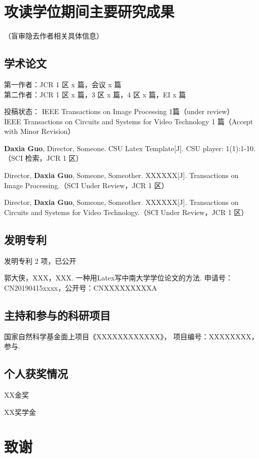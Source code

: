 \section{攻读学位期间主要研究成果} %

\ifblindreview
\noindent
（盲审隐去作者相关具体信息）
\fi
\subsection{学术论文}

\ifblindreview

\noindent
第一作者：JCR 1 区 x 篇，会议 x 篇 \\{}
第二作者：JCR 1 区 x 篇，3 区 x 篇，4 区 x 篇，EI x 篇 

\noindent
投稿状态： 
IEEE Transactions on Image Processing 1篇（under review）\\{}
IEEE Transactions on Circuits and Systems for Video Technology 1 篇（Accept with Minor Revision）
\else
\begin{enumerate}[label={[\arabic*]}]
\item \textbf{Daxia Guo}, Director, Someone. CSU Latex Template[J]. CSU player: 1(1):1-10. （SCI 检索，JCR 1 区）
\item Director, \textbf{Daxia Guo}, Someone, Someother. XXXXXX[J]. Transactions on Image Processing.（SCI Under Review，JCR 1 区）
\item Director, \textbf{Daxia Guo}, Someone, Someother. XXXXXX[J]. Transactions on Circuits and Systems for Video Technology.（SCI Under Review，JCR 1 区）
\end{enumerate}
\fi
\subsection{发明专利}
\ifblindreview
\noindent
发明专利 2 项，已公开
\else
\begin{enumerate}[label={[\arabic*]}]
\item 郭大侠，XXX，XXX. 一种用Latex写中南大学学位论文的方法. 申请号：CN20190415xxxx，公开号：CNXXXXXXXXXA
\end{enumerate}
\fi

\ifblindreview
\else
\subsection{主持和参与的科研项目}
\begin{enumerate}[label={[\arabic*]}]
\item 国家自然科学基金面上项目《XXXXXXXXXXXX》， 项目编号：XXXXXXXX，参与.
\end{enumerate}

\subsection{个人获奖情况}
\noindent
\begin{enumerate}[label={[\arabic*]}]
\item XX金奖
\item XX奖学金
\end{enumerate}
\fi

\newpage

\ifblindreview
\else
\section{致谢} %
\lipsum
\newpage
\fi